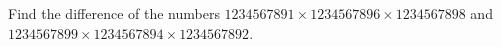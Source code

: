 Find the difference of the numbers $1234567891\times1234567896\times1234567898$ and $1234567899 \times 1234567894 \times 1234567892$.
